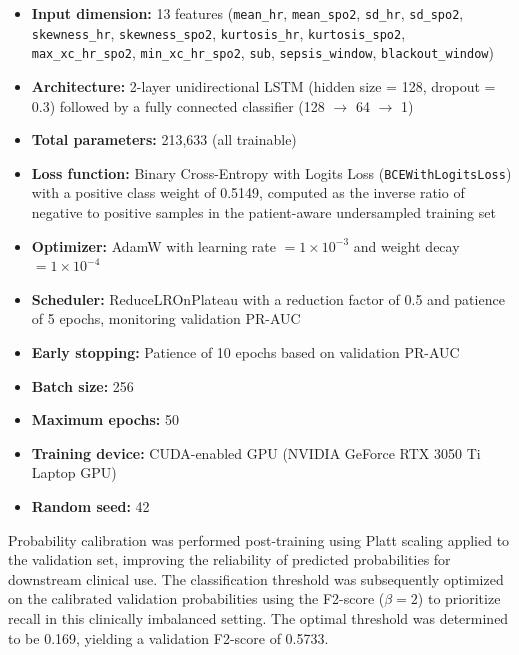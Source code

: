 \documentclass[conference]{IEEEtran}
\begin{document}
\begin{itemize}
    \item \textbf{Input dimension:} 13 features 
    (\texttt{mean\_hr}, \texttt{mean\_spo2}, 
    \texttt{sd\_hr}, \texttt{sd\_spo2}, 
    \texttt{skewness\_hr}, \texttt{skewness\_spo2}, 
    \texttt{kurtosis\_hr}, \texttt{kurtosis\_spo2}, 
    \texttt{max\_xc\_hr\_spo2}, \texttt{min\_xc\_hr\_spo2}, 
    \texttt{sub}, \texttt{sepsis\_window}, 
    \texttt{blackout\_window})

    \item \textbf{Architecture:} 2-layer unidirectional LSTM 
    (hidden size = 128, dropout = 0.3) followed by a fully 
    connected classifier (128 $\rightarrow$ 64 $\rightarrow$ 1)

    \item \textbf{Total parameters:} 213,633 (all trainable)

    \item \textbf{Loss function:} Binary Cross-Entropy with 
    Logits Loss (\texttt{BCEWithLogitsLoss}) with a positive 
    class weight of 0.5149, computed as the inverse ratio of 
    negative to positive samples in the patient-aware 
    undersampled training set

    \item \textbf{Optimizer:} AdamW with learning rate 
    $= 1 \times 10^{-3}$ and weight decay 
    $= 1 \times 10^{-4}$

    \item \textbf{Scheduler:} ReduceLROnPlateau with a 
    reduction factor of 0.5 and patience of 5 epochs, 
    monitoring validation PR-AUC

    \item \textbf{Early stopping:} Patience of 10 epochs 
    based on validation PR-AUC

    \item \textbf{Batch size:} 256

    \item \textbf{Maximum epochs:} 50

    \item \textbf{Training device:} CUDA-enabled GPU 
    (NVIDIA GeForce RTX 3050 Ti Laptop GPU)

    \item \textbf{Random seed:} 42
\end{itemize}

Probability calibration was performed post-training using 
Platt scaling applied to the validation set, improving the 
reliability of predicted probabilities for downstream 
clinical use. The classification threshold was subsequently 
optimized on the calibrated validation probabilities using 
the F2-score ($\beta = 2$) to prioritize recall in this 
clinically imbalanced setting. The optimal threshold was 
determined to be 0.169, yielding a validation F2-score 
of 0.5733.
\end{document}

